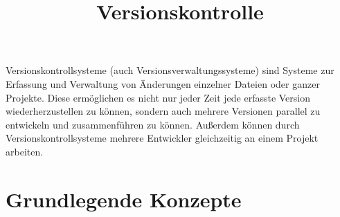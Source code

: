 \documentclass[11pt,a4paper,sans]{moderncv}        %
\title{Versionskontrolle}                               %
\begin{document}
\makecvtitle

\small{Versionskontrollsysteme (auch Versionsverwaltungssysteme) sind Systeme zur Erfassung und Verwaltung von Änderungen einzelner Dateien oder ganzer Projekte. Diese ermöglichen es nicht nur jeder Zeit jede erfasste Version wiederherzustellen zu können, sondern auch mehrere Versionen parallel zu entwickeln und zusammenführen zu können. Außerdem können durch Versionskontrollsysteme mehrere Entwickler gleichzeitig an einem Projekt arbeiten.}

\section{Grundlegende Konzepte}

\vspace{6pt}
\end{document}
